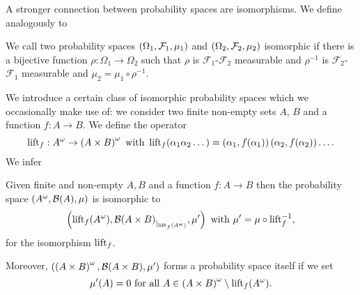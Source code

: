 A stronger connection between probability spaces are isomorphisms. We define
analogously to \cite[Definition 8.34]{Klenke}
\begin{definition}
  We call two probability spaces $\left(\Omega_{1}, \mathcal{F}_{1}, \mu_{1}\right)$
  and $\left(\Omega_{2}, \mathcal{F}_{2}, \mu_{2}\right)$ isomorphic if there is a
  bijective function $\rho:\Omega_{1}\rightarrow\Omega_{2}$ such that
  $\rho$ is $\mathcal{F}_{1}$-$\mathcal{F}_{2}$ measurable and $\rho^{-1}$ is
  $\mathcal{F}_{2}$-$\mathcal{F}_{1}$ measurable and 
  $\mu_{2} = \mu_{1}\circ\rho^{-1}$.
\end{definition}
We introduce a certain class of isomorphic probability spaces which we 
occasionally make use of: we consider two finite non-empty sets $A$, $B$ and
a function $f:A\rightarrow B$. We define the operator
\begin{equation*}
  \operatorname{lift}_{f}:A^{\omega}\rightarrow\left(A\times B\right)^{\omega}
  \text{ with }\operatorname{lift}_{f}(\alpha_{1}\alpha_{2}\dots) = 
    \left(\alpha_{1}, f(\alpha_{1})\right)\left(\alpha_{2}, f(\alpha_{2})\right)\dots.
\end{equation*}
We infer
\begin{lemma}
  Given finite and non-empty $A, B$ and a function $f:A\rightarrow B$ then the
  probability space $\left(A^{\omega}, \mathcal{B}(A), \mu\right)$ is isomorphic to
  \begin{equation*}
    \left(\operatorname{lift}_{f}(A^{\omega}), 
      {\mathcal{B}(A\times B)}_{|_{\operatorname{lift}_{f}(A^{\omega})}}, \mu'
    \right) \text{ with } \mu' = \mu\circ\operatorname{lift}_{f}^{-1},
  \end{equation*}
  for the isomorphism $\operatorname{lift}_{f}$.

  Moreover, $\left(\left(A\times B\right)^{\omega}, \mathcal{B}(A\times B),
  \mu'\right)$ forms a probability space itself if we set
  \begin{equation*}
    \mu'(A) = 0\text{ for all }A\in
    \left(A\times B\right)^{\omega}\setminus\operatorname{lift}_{f}(A^{\omega}).
  \end{equation*}
  \label{lem:liftisomorphism}
\end{lemma}
